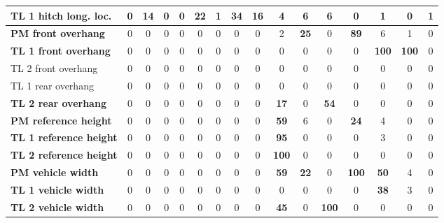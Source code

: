 \begin{table}[H]
\begin{tabular}{|l|c|c|c|c|c|c|c|c|c|c|c|c|c|c|c|}
\hline
\textcolor[rgb]{0.000, 0.620, 0.451}{\textbf{TL 1 hitch long. loc.}} & 0 & \textbf{14} & 0 & 0 & \textbf{22} & 1 & \textcolor[rgb]{0.000, 0.620, 0.451}{\textbf{34}} & \textbf{16} & 4 & 6 & 6 & 0 & 1 & 0 & 1 \\
\hline
\textcolor[rgb]{0.000, 0.447, 0.698}{\textbf{PM front overhang}} & 0 & 0 & 0 & 0 & 0 & 0 & 0 & 0 & 2 & \textcolor[rgb]{0.000, 0.620, 0.451}{\textbf{25}} & 0 & \textcolor[rgb]{0.000, 0.447, 0.698}{\textbf{89}} & 6 & 1 & 0 \\
\hline
\textcolor[rgb]{0.851, 0.373, 0.008}{\textbf{TL 1 front overhang}} & 0 & 0 & 0 & 0 & 0 & 0 & 0 & 0 & 0 & 0 & 0 & 0 & \textcolor[rgb]{0.835, 0.369, 0.000}{\textbf{100}} & \textcolor[rgb]{0.835, 0.369, 0.000}{\textbf{100}} & 0 \\
\hline
TL 2 front overhang & 0 & 0 & 0 & 0 & 0 & 0 & 0 & 0 & 0 & 0 & 0 & 0 & 0 & 0 & 0 \\
\hline
TL 1 rear overhang & 0 & 0 & 0 & 0 & 0 & 0 & 0 & 0 & 0 & 0 & 0 & 0 & 0 & 0 & 0 \\
\hline
\textcolor[rgb]{0.000, 0.447, 0.698}{\textbf{TL 2 rear overhang}} & 0 & 0 & 0 & 0 & 0 & 0 & 0 & 0 & \textbf{17} & 0 & \textcolor[rgb]{0.000, 0.447, 0.698}{\textbf{54}} & 0 & 0 & 0 & 0 \\
\hline
\textcolor[rgb]{0.000, 0.447, 0.698}{\textbf{PM reference height}} & 0 & 0 & 0 & 0 & 0 & 0 & 0 & 0 & \textcolor[rgb]{0.000, 0.447, 0.698}{\textbf{59}} & 6 & 0 & \textbf{24} & 4 & 0 & 0 \\
\hline
\textcolor[rgb]{0.000, 0.447, 0.698}{\textbf{TL 1 reference height}} & 0 & 0 & 0 & 0 & 0 & 0 & 0 & 0 & \textcolor[rgb]{0.000, 0.447, 0.698}{\textbf{95}} & 0 & 0 & 0 & 3 & 0 & 0 \\
\hline
\textcolor[rgb]{0.851, 0.373, 0.008}{\textbf{TL 2 reference height}} & 0 & 0 & 0 & 0 & 0 & 0 & 0 & 0 & \textcolor[rgb]{0.835, 0.369, 0.000}{\textbf{100}} & 0 & 0 & 0 & 0 & 0 & 0 \\
\hline
\textcolor[rgb]{0.851, 0.373, 0.008}{\textbf{PM vehicle width}} & 0 & 0 & 0 & 0 & 0 & 0 & 0 & 0 & \textcolor[rgb]{0.000, 0.447, 0.698}{\textbf{59}} & \textbf{22} & 0 & \textcolor[rgb]{0.835, 0.369, 0.000}{\textbf{100}} & \textcolor[rgb]{0.000, 0.447, 0.698}{\textbf{50}} & 4 & 0 \\
\hline
\textcolor[rgb]{0.000, 0.620, 0.451}{\textbf{TL 1 vehicle width}} & 0 & 0 & 0 & 0 & 0 & 0 & 0 & 0 & 0 & 0 & 0 & 0 & \textcolor[rgb]{0.000, 0.620, 0.451}{\textbf{38}} & 3 & 0 \\
\hline
\textcolor[rgb]{0.851, 0.373, 0.008}{\textbf{TL 2 vehicle width}} & 0 & 0 & 0 & 0 & 0 & 0 & 0 & 0 & \textcolor[rgb]{0.000, 0.620, 0.451}{\textbf{45}} & 0 & \textcolor[rgb]{0.835, 0.369, 0.000}{\textbf{100}} & 0 & 0 & 0 & 0 \\
\hline

\end{tabular}%
\end{table}%

